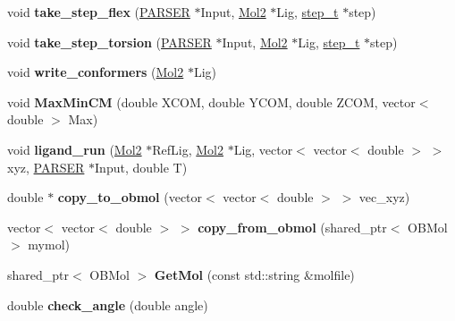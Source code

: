 \begin{DoxyCompactItemize}
\item 
\hypertarget{classMC_aa2cd1530ea71c1cef8d29d2ead491668}{
void {\bfseries take\_\-step\_\-flex} (\hyperlink{classPARSER}{PARSER} $\ast$Input, \hyperlink{classMol2}{Mol2} $\ast$Lig, \hyperlink{structMC_1_1step__t}{step\_\-t} $\ast$step)}
\label{classMC_aa2cd1530ea71c1cef8d29d2ead491668}

\item 
\hypertarget{classMC_a7f3d826bbb003d71b863f1b5a80103a8}{
void {\bfseries take\_\-step\_\-torsion} (\hyperlink{classPARSER}{PARSER} $\ast$Input, \hyperlink{classMol2}{Mol2} $\ast$Lig, \hyperlink{structMC_1_1step__t}{step\_\-t} $\ast$step)}
\label{classMC_a7f3d826bbb003d71b863f1b5a80103a8}

\item 
\hypertarget{classMC_a12d646bfbf1d5cd1b4da81362f4d8842}{
void {\bfseries write\_\-conformers} (\hyperlink{classMol2}{Mol2} $\ast$Lig)}
\label{classMC_a12d646bfbf1d5cd1b4da81362f4d8842}

\item 
\hypertarget{classMC_a5d9e957ffb3451e5ded19bef31bbb4e5}{
void {\bfseries MaxMinCM} (double XCOM, double YCOM, double ZCOM, vector$<$ double $>$ Max)}
\label{classMC_a5d9e957ffb3451e5ded19bef31bbb4e5}

\item 
\hypertarget{classMC_aa86bbbc7d1422c1c71471996dcd6c04c}{
void {\bfseries ligand\_\-run} (\hyperlink{classMol2}{Mol2} $\ast$RefLig, \hyperlink{classMol2}{Mol2} $\ast$Lig, vector$<$ vector$<$ double $>$ $>$ xyz, \hyperlink{classPARSER}{PARSER} $\ast$Input, double T)}
\label{classMC_aa86bbbc7d1422c1c71471996dcd6c04c}

\item 
\hypertarget{classMC_aeefa103263e6a7e7c5a9f11b87d8ed69}{
double $\ast$ {\bfseries copy\_\-to\_\-obmol} (vector$<$ vector$<$ double $>$ $>$ vec\_\-xyz)}
\label{classMC_aeefa103263e6a7e7c5a9f11b87d8ed69}

\item 
\hypertarget{classMC_a9be6272ea5ab285e9886f824a3576331}{
vector$<$ vector$<$ double $>$ $>$ {\bfseries copy\_\-from\_\-obmol} (shared\_\-ptr$<$ OBMol $>$ mymol)}
\label{classMC_a9be6272ea5ab285e9886f824a3576331}

\item 
\hypertarget{classMC_ae7e44b5f94a065951a40cb85fa46eeb7}{
shared\_\-ptr$<$ OBMol $>$ {\bfseries GetMol} (const std::string \&molfile)}
\label{classMC_ae7e44b5f94a065951a40cb85fa46eeb7}

\item 
\hypertarget{classMC_a0911a662b241e7ea8bd6b828bb67ef5f}{
double {\bfseries check\_\-angle} (double angle)}
\label{classMC_a0911a662b241e7ea8bd6b828bb67ef5f}


\end{DoxyCompactItemize}
